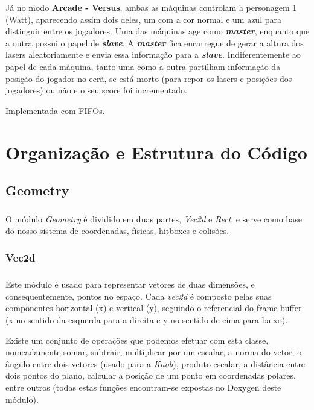 \documentclass{report}
\begin{document}
Já no modo \textbf{Arcade - Versus}, ambas as máquinas controlam a personagem 1 (Watt), aparecendo assim dois deles, um com a cor normal e um azul para distinguir entre os jogadores. Uma das máquinas age como \textbf{\textit{master}}, enquanto que a outra possui o papel de \textbf{\textit{slave}}. A \textbf{\textit{master}} fica encarregue de gerar a altura dos lasers aleatoriamente e envia essa informação para a \textbf{\textit{slave}}. Indiferentemente ao papel de cada máquina, tanto uma como a outra partilham informação da posição do jogador no ecrã, se está morto (para repor os lasers e posições dos jogadores) ou não e o seu score foi incrementado.

Implementada com FIFOs.

\chapter{Organização e Estrutura do Código}

\section{Geometry}

\paragraph{}
O módulo \textit{Geometry} é dividido em duas partes, \textit{Vec2d} e \textit{Rect}, e serve como base do nosso sistema de coordenadas, físicas, hitboxes e colisões. 
\subsection{Vec2d}

\paragraph{}
Este módulo é usado para representar vetores de duas dimensões, e consequentemente, pontos no espaço. Cada \textit{vec2d} é composto pelas suas componentes horizontal (x) e vertical (y), seguindo o referencial do frame buffer (x no sentido da esquerda para a direita e y no sentido de cima para baixo).

Existe um conjunto de operações que podemos efetuar com esta classe, nomeadamente somar, subtrair, multiplicar por um escalar, a norma do vetor, o ângulo entre dois vetores (usado para a \textit{Knob}), produto escalar, a distância entre dois pontos do plano, calcular a posição de um ponto em coordenadas polares, entre outros (todas estas funções encontram-se expostas no Doxygen deste módulo).
\end{document}
